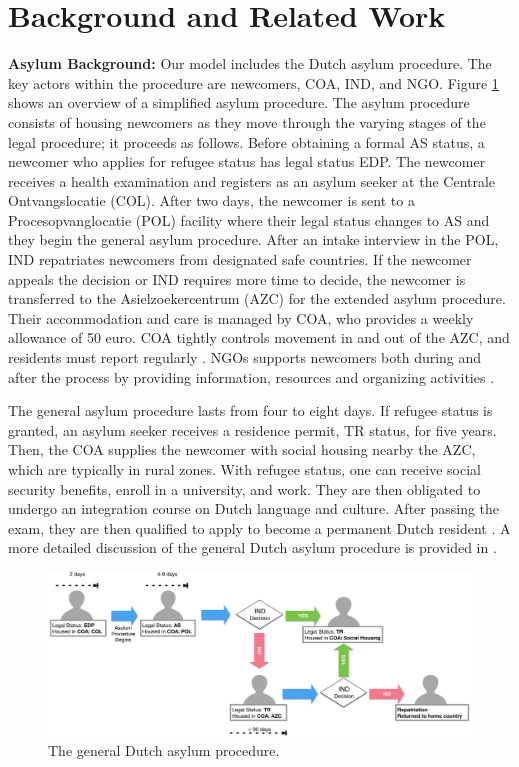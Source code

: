 \documentclass{scspaperproc}
\theoremstyle{scsthe}
\begin{document}
\section{Background and Related Work}
\label{sec:value-background}
{\bf Asylum Background:} Our model includes the Dutch asylum procedure. The key actors within the procedure are newcomers, COA, IND, and NGO. Figure \ref{fig:asy-proc} shows an overview of a simplified asylum procedure. The asylum procedure consists of housing newcomers as they move through the varying stages of the legal procedure; it proceeds as follows. Before obtaining a formal AS status, a newcomer who applies for refugee status has legal status EDP. The newcomer receives a health examination and registers as an asylum seeker at the Centrale Ontvangslocatie (COL). After two days, the newcomer is sent to a Procesopvanglocatie (POL) facility where their legal status changes to AS and they begin the general asylum procedure. After an intake interview in the POL, IND repatriates newcomers from designated safe countries. If the newcomer appeals the decision or IND requires more time to decide, the newcomer is transferred to the Asielzoekercentrum (AZC) for the extended asylum procedure. Their accommodation and care is managed by COA, who provides a weekly allowance of 50 euro. COA tightly controls movement in and out of the AZC, and residents must report regularly \cite{9}. NGOs supports newcomers both during and after the process by providing information, resources and organizing activities \cite{94}.

The general asylum procedure lasts from four to eight days. If refugee status is granted, an asylum seeker receives a residence permit, TR status, for five years. Then, the COA supplies the newcomer with social housing nearby the AZC, which are typically in rural zones. With refugee status, one can receive social security benefits, enroll in a university, and work. They are then obligated to undergo an integration course on Dutch language and culture. After passing the exam, they are then qualified to apply to become a permanent Dutch resident \cite{9}. A more detailed discussion of the general Dutch asylum procedure is provided in \cite{phil.masters.thesis}.

\begin{figure}[htb]
{
\centering
\includegraphics[width=0.75\columnwidth]{Asylum-Procedure.png}
\caption{The general Dutch asylum procedure.}
\label{fig:asy-proc}
}
\end{figure}
\end{document}
